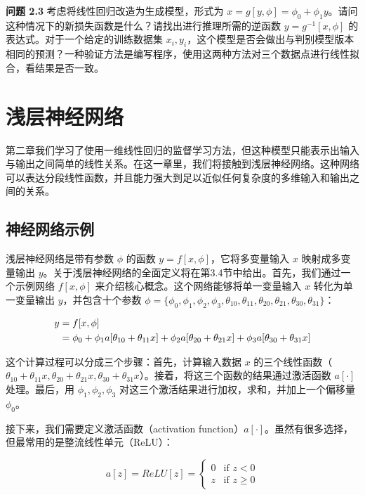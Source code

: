 \documentclass[lang=cn,newtx,10pt,scheme=chinese]{elegantbook}
\begin{document}
\textbf{问题 2.3} 考虑将线性回归改造为生成模型，形式为 $x = g[y, \phi] = \phi_0 + \phi_1 y$。请问这种情况下的新损失函数是什么？请找出进行推理所需的逆函数 $y = g^{-1}[x, \phi]$ 的表达式。对于一个给定的训练数据集 {${x_i,y_i}$}，这个模型是否会做出与判别模型版本相同的预测？一种验证方法是编写程序，使用这两种方法对三个数据点进行线性拟合，看结果是否一致。

\chapter{浅层神经网络}

第二章我们学习了使用一维线性回归的监督学习方法，但这种模型只能表示出输入与输出之间简单的线性关系。在这一章里，我们将接触到浅层神经网络。这种网络可以表达分段线性函数，并且能力强大到足以近似任何复杂度的多维输入和输出之间的关系。

\section{神经网络示例}

浅层神经网络是带有参数 \(\phi\) 的函数 \(y = f[x, \phi]\)，它将多变量输入 \(x\) 映射成多变量输出 \(y\)。关于浅层神经网络的全面定义将在第3.4节中给出。首先，我们通过一个示例网络 \(f[x, \phi]\) 来介绍核心概念。这个网络能够将单一变量输入 \(x\) 转化为单一变量输出 \(y\)，并包含十个参数 \(\phi = \{\phi_0, \phi_1, \phi_2, \phi_3, \theta_{10}, \theta_{11}, \theta_{20}, \theta_{21}, \theta_{30}, \theta_{31}\}\)：


\begin{align}
	y &= f[x, \phi] \notag \\ 
	&= \phi_0 + \phi_1a[\theta_{10} + \theta_{11}x] + \phi_2a[\theta_{20} + \theta_{21}x] + \phi_3a[\theta_{30} + \theta_{31}x] 
\end{align}


这个计算过程可以分成三个步骤：首先，计算输入数据 \(x\) 的三个线性函数（\(\theta_{10} + \theta_{11}x, \theta_{20} + \theta_{21}x, \theta_{30} + \theta_{31}x\)）。接着，将这三个函数的结果通过激活函数 \(a[\cdot]\) 处理。最后，用 \(\phi_1, \phi_2, \phi_3\) 对这三个激活结果进行加权，求和，并加上一个偏移量 \(\phi_0\)。

接下来，我们需要定义激活函数（activation function）\(a[\cdot]\)。虽然有很多选择，但最常用的是整流线性单元（ReLU）：

\begin{equation}
a[z] = ReLU[z] = 
\begin{cases}
	0 & \text{if } z < 0 \\
	z & \text{if } z \geq 0
\end{cases} 
\end{equation}
\end{document}
